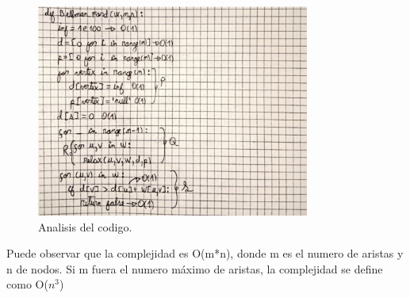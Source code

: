 \begin{figure}[H]
	\centering
	\includegraphics[width=0.8\textwidth]{complejidad_distancia_ejem2_2.png}
	\caption{Analisis del codigo.}
	\label{fig:complejidad1}
\end{figure}

Puede observar que la complejidad es O(m*n), donde m es el numero de aristas y n de nodos. Si m fuera el numero máximo de aristas, la complejidad se define como O($n^3$)
